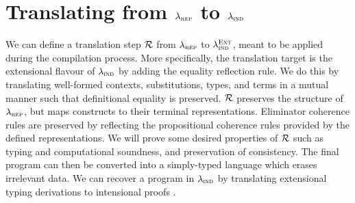 \section{Translating from $\lambda_{\textsc{rep}}$ to $\lambda_{\textsc{ind}}$}

We can define a translation step $\mathcal{R}$ from $\lambda_{\textsc{rep}}$ to
$\lambda_{\textsc{ind}}^{\textsc{Ext}}$, meant to be applied during the compilation process.
More specifically, the translation target is the extensional flavour of
$\lambda_{\textsc{ind}}$ by adding the equality reflection rule. We do this by translating
well-formed contexts, substitutions, types, and terms in a mutual manner such
that definitional equality is preserved. $\mathcal{R}$ preserves the structure of
$\lambda_{\textsc{rep}}$, but maps constructs to their terminal representations. Eliminator
coherence rules are preserved by reflecting the propositional coherence rules
provided by the defined representations. We will prove some desired properties
of $\mathcal{R}$ \cite{Boulier2017-cm} such as typing and computational soundness, and
preservation of consistency. The final program can then be converted into a
simply-typed language which erases irrelevant data. We can recover a program in
$\lambda_{\textsc{ind}}$ by translating extensional typing derivations to intensional proofs
\cite{Winterhalter2019-zw}.
